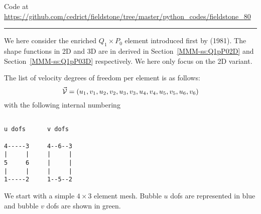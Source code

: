 

\begin{center}
Code at \url{https://github.com/cedrict/fieldstone/tree/master/python_codes/fieldstone_80}
\end{center}

\par\noindent\rule{\textwidth}{0.4pt}

We here consider the enriched $Q_1\times P_0$ element introduced first by \textcite{fort81} (1981).
The shape functions in 2D and 3D are in derived in Section~\ref{MMM-ss:Q1pP02D} 
and Section~\ref{MMM-ss:Q1pP03D} respectively. We here only focus on the 2D variant.

The list of velocity degrees of freedom per element is as follows:
\[
\vec{\cal V} = (u_1,v_1,u_2,v_2,u_3,v_3,u_4,v_4,u_5,v_5,u_6,v_6)
\]
with the following internal numbering
\begin{verbatim}

u dofs      v dofs

4-----3     4--6--3
|     |     |     |
5     6     |     |
|     |     |     |
1-----2     1--5--2

\end{verbatim}

We start with a simple $4\times 3$ element mesh. 
Bubble $u$ dofs are represented in blue and bubble $v$ dofs are shown in green.




